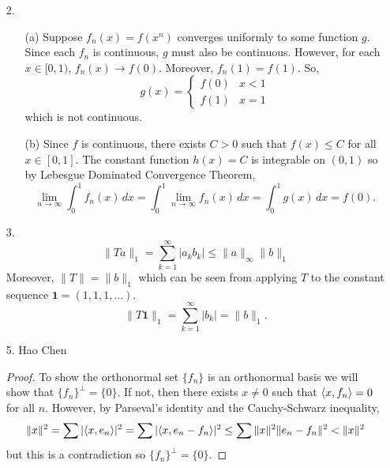 \begin{itemize}

\item[2.]
	\begin{itemize}
		\item[(a)] Suppose $f_n(x) = f(x^n)$ converges uniformly to some function $g$. Since each $f_n$ is continuous, $g$ must also be continuous. However, for each $x \in [0,1)$, $f_n(x) \to f(0)$. Moreover, $f_n(1) = f(1)$. So,
	\[ g(x) = \left\{ \begin{array}{cc} f(0) & x <1 \\ f(1) & x=1 \end{array} \right. \]
which is not continuous.
		\item[(b)] Since $f$ is continuous, there exists $C>0$ such that $f(x) \le C$ for all $x \in [0,1]$. The constant function $h(x)=C$ is integrable on $(0,1)$ so by Lebesgue Dominated Convergence Theorem,
		\[ \lim_{n \to \infty} \int_0^1 f_n(x) \, dx = \int_0^1 \lim_{n \to \infty} f_n(x) \, dx = \int_0^1 g(x) \, dx = f(0). \]
	\end{itemize}	

\item[3.]
	\[ \|Ta\|_1 = \sum_{k=1}^\infty |a_kb_k| \le \|a\|_\infty \|b\|_1 \]
Moreover, $\|T\| = \|b\|_1$ which can be seen from applying $T$ to the constant sequence $\mathbf{1} = (1,1,1,\ldots)$. 
	\[ \|T \mathbf{1} \|_1 = \sum_{k=1}^\infty |b_k| = \|b\|_1. \]

\item[5.] Hao Chen
\begin{proof}
To show the orthonormal set $\{f_n\}$ is an orthonormal basis we will show that $\{f_n\}^\perp = \{0\}$. If not, then there exists $x \ne 0$ such that $\langle x,f_n\rangle = 0$ for all $n$. However, by Parseval's identity and the Cauchy-Schwarz inequality,
	\[ \|x\|^2 = \sum |\langle x,e_n\rangle|^2 = \sum | \langle x,e_n-f_n\rangle|^2 \le \sum \|x\|^2\|e_n-f_n\|^2 < \|x\|^2 \]
but this is a contradiction so $\{f_n\}^\perp = \{0\}$.
\end{proof}


\end{itemize}

